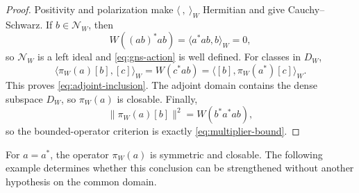 \documentclass[11pt]{article}
\theoremstyle{definition}
\theoremstyle{remark}
\numberwithin{equation}{section}
\newcommand{\cN}{\mathcal N}
\begin{document}
\begin{proof}
Positivity and polarization make $\langle\ ,\ \rangle_W$ Hermitian and
give Cauchy--Schwarz.  If $b\in\cN_W$, then
\[
 W((ab)^*ab)=\langle a^*ab,b\rangle_W=0,
\]
so $\cN_W$ is a left ideal and \eqref{eq:gns-action} is well defined.
For classes in $D_W$,
\[
 \langle\pi_W(a)[b],[c]\rangle_W
 =W(c^*ab)
 =\langle[b],\pi_W(a^*)[c]\rangle_W.
\]
This proves \eqref{eq:adjoint-inclusion}.  The adjoint domain contains
the dense subspace $D_W$, so $\pi_W(a)$ is closable.  Finally,
\[
 \|\pi_W(a)[b]\|^2=W(b^*a^*ab),
\]
so the bounded-operator criterion is exactly
\eqref{eq:multiplier-bound}.
\end{proof}

For $a=a^*$, the operator $\pi_W(a)$ is symmetric and closable.
The following example determines whether this conclusion can be strengthened
without another hypothesis on the common domain.
\end{document}
